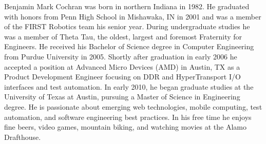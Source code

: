 \documentclass[12pt]{report}	%
\theoremstyle{definition}
\theoremstyle{remark}
\begin{document}
\begin{vita}
Benjamin Mark Cochran was born in northern Indiana in 1982. He graduated
with honors from Penn High School in Mishawaka, IN in 2001 and was a
member of the FIRST Robotics team his senior year. During undergraduate
studies he was a member of Theta Tau, the oldest, largest and foremost
Fraternity for Engineers. He received his Bachelor of Science degree in
Computer Engineering from Purdue University in 2005. Shortly after
graduation in early 2006 he accepted a position at Advanced Micro
Devices (AMD) in Austin, TX as a Product Development Engineer focusing
on DDR and HyperTransport I/O interfaces and test automation. In early
2010, he began graduate studies at the University of Texas at Austin,
pursuing a Master of Science in Engineering degree. He is passionate
about emerging web technologies, mobile computing, test automation, and
software engineering best practices. In his free time he enjoys fine
beers, video games, mountain biking, and watching movies at the Alamo
Drafthouse.
\end{vita}
\end{document}
